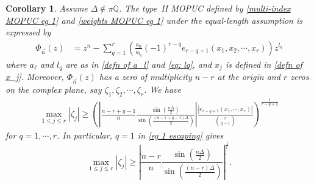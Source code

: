 \documentclass[a4paper,10pt,leqno]{amsart}
\numberwithin{equation}{section}
\newtheorem{corollary}[theorem]{Corollary}
\theoremstyle{remark}
\begin{document}
\begin{corollary}\label{cor: MOPUC type II eg 1} Assume $\Delta \notin \pi \mathbb Q$.
The type~II MOPUC defined by \eqref{multi-index MOPUC eg 1} and \eqref{weights MOPUC eg 1} under the equal-length assumption is expressed by
\begin{align} \label{MOPUC type II eg 1}
\Phi_{\vec{n}}(z) &= z^n - \sum_{q=1}^r \left( \frac{a_n}{a_{l_q}} (-1)^{r-q} e_{r-q+1}(x_1, x_2, \cdots, x_r) \right) z^{l_q}
\end{align}
where $a_\ell$ and $l_q$ are as in \eqref{defn of a_l} and \eqref{eq: lq}, and $x_j$ is defined in \eqref{defn of x_j}.
Moreover, $\Phi_{\vec{n}}(z)$ has a zero of multiplicity $n-r$ at the origin and $r$ zeros on the complex plane, say $\zeta_1, \zeta_2, \cdots, \zeta_r$. We have
\begin{align} \label{eg 1 escaping}
\max_{1\leq j \leq r} |\zeta_j| \geq \left( \left| \frac{n-r+q-1}{n} \frac{\sin \left(\frac{n\Delta}{2} \right)}{\sin \left(\frac{(n-r+q-1) \Delta}{2} \right)}\right| \frac{|e_{r-q+1}(x_1, \cdots, x_r)|}{\binom{r}{q-1}}\right)^{\frac{1}{r-q+1}}
\end{align}
for $q = 1, \cdots, r$. In particular, $q = 1$ in \eqref{eg 1 escaping} gives
\begin{equation}\label{maxzej}
        \max_{1\leq j \leq r} |\zeta_j| \geq \left| \frac{n-r}{n} \frac{\sin \left(\frac{n\Delta}{2} \right)}{\sin \left(\frac{(n-r) \Delta}{2} \right)}\right|^{\frac1r}.
\end{equation}

\end{corollary}
\end{document}
